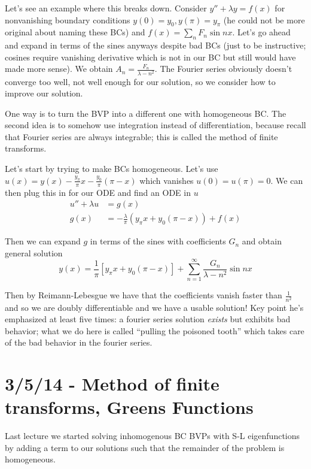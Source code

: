 \documentclass[10pt]{report}
\begin{document}
Let's see an example where this breaks down. Consider $y'' + \lambda y = f(x)$ for nonvanishing boundary conditions $y(0) = y_0, y(\pi) = y_\pi$ (he could not be more original about naming these BCs) and $f(x) = \sum_{n}^{}F_n \sin nx$. Let's go ahead and expand in terms of the sines anyways despite bad BCs (just to be instructive; cosines require vanishing derivative which is not in our BC but still would have made more sense). We obtain $A_n = \frac{F_n}{\lambda - n^2}$. The Fourier series obviously doesn't converge too well, not well enough for our solution, so we consider how to improve our solution.

One way is to turn the BVP into a different one with homogeneous BC. The second idea is to somehow use integration instead of differentiation, because recall that Fourier series are always integrable; this is called the method of finite transforms.

Let's start by trying to make BCs homogeneous. Let's use $u(x) = y(x) - \frac{y_{\pi}}{\pi}x - \frac{y_0}{\pi}(\pi - x)$ which vanishes $u(0) = u(\pi) = 0$. We can then plug this in for our ODE and find an ODE in $u$
\begin{align}
    u'' + \lambda u &= g(x)\\
    g(x) &= -\frac{\lambda}{\pi}\left( y_\pi x + y_0(\pi - x) \right) + f(x)
\end{align}

Then we can expand $g$ in terms of the sines with coefficients $G_n$ and obtain general solution
\begin{equation}
    y(x) = \frac{1}{\pi}\left[ y_\pi x + y_0(\pi-x) \right] + \sum_{n=1}^{\infty}\frac{G_n}{\lambda - n^2}\sin nx
\end{equation}

Then by Reimann-Lebesgue we have that the coefficients vanish faster than $\frac{1}{n^2}$ and so we are doubly differentiable and we have a usable solution! Key point he's emphasized at least five times: a fourier series solution \emph{exists} but exhibits bad behavior; what we do here is called ``pulling the poisoned tooth'' which takes care of the bad behavior in the fourier series.


\chapter{3/5/14 - Method of finite transforms, Greens Functions}

Last lecture we started solving inhomogenous BC BVPs with S-L eigenfunctions by adding a term to our solutions such that the remainder of the problem is homogeneous.
\end{document}
